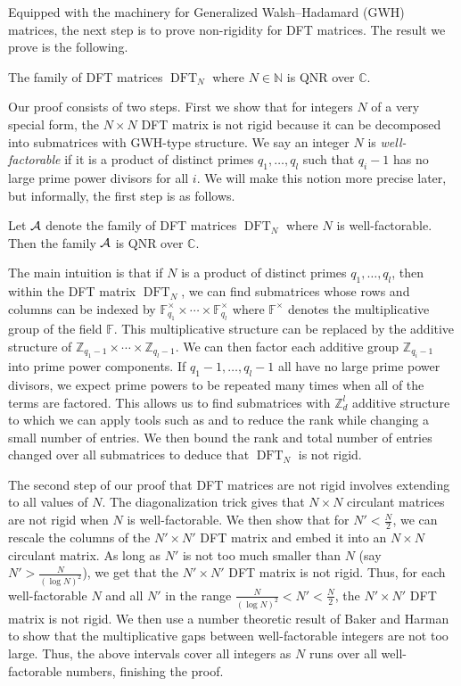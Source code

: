 \documentclass{toc}
\newcommand\F{{\mathbb{F}}}
\renewcommand\Z{{\mathbb{Z}}}
\renewcommand\N{{\mathbb{N}}}
\renewcommand\C{{\mathbb{C}}}
\DeclareMathOperator{\DFT}{DFT}
\begin{document}
Equipped with the machinery for
Generalized Walsh--Hadamard (GWH) matrices,
the next step is to prove non-rigidity for DFT 
matrices.  The result we prove is the following.
\begin{theorem}\label{fullFourier_intro}
The family of DFT matrices $\DFT_N$
where $N \in \N$ is QNR over $\C$.
\end{theorem} 
Our proof consists of two steps.  First we show that for integers $N$ of a very special form, the $N \times N$ DFT 
 matrix is not rigid because it can be decomposed into submatrices with 
GWH-type structure.  We say an integer $N$ is
\emph{well-factorable}  %
%
if it is a product of distinct primes $q_1, \dots , q_l$ such that %
$q_i - 1$ has no large prime power divisors for all $i$.
%
%
We will make this notion more precise later, but informally, the first step is
as follows. 
\begin{theorem} \label{main_informal}
Let $\cal A$ denote the family of DFT matrices $\DFT_N$
 where $N$ is well-factorable.  Then the family $\cal A$ is QNR over $\C$.
\end{theorem}
The main intuition is that if $N$ is a product of distinct primes
$q_1, \dots , q_l$, then within the DFT matrix $\DFT_N$,
we can find submatrices whose rows and columns can be indexed by
$\F_{q_1}^{\times} \times \cdots \times \F_{q_l}^{\times}$ where
$\F^{\times}$ denotes the multiplicative group of the field $\F$.
This multiplicative structure can be replaced by the additive structure of $\Z_{q_1-1} \times \cdots \times \Z_{q_l-1}$.  We can then factor each additive group $\Z_{q_i-1}$ into prime power components.  If $q_1-1, \dots , q_l-1$ all have no large prime power divisors, we expect prime powers to be repeated many times when all of the terms are factored. This allows us to find submatrices with $\Z_d^l$ additive structure
%
to  %
which we can apply tools such as  and  to reduce the rank while changing a small number of entries.  We then bound the rank and total number of entries changed over all submatrices to deduce that $\DFT_N$ is not rigid.

The second step of our proof that DFT
matrices are not rigid involves extending  to all values of $N$. The diagonalization trick gives that $N \times N$ circulant matrices are not rigid when $N$ is well-factorable.  We then show that for $N' < \frac{N}{2}$, we can rescale the columns of the $N' \times N'$ DFT 
 matrix and embed it into an $N \times N$ circulant matrix.  As long as $N'$ is not too much smaller than $N$ (say $N' > \frac{N}{(\log N)^2}$), we get that the $N' \times N'$ DFT 
 matrix is not rigid.  Thus, for each well-factorable $N$ and all $N'$ in the range $\frac{N}{(\log N)^2} < N' < \frac{N}{2}$, the $N' \times N'$ DFT 
matrix is not rigid.  We then use a number theoretic result of
Baker and Harman  %
\cite{smooth_primes} to show that the
%
%
%
multiplicative gaps  %
between well-factorable integers are not too large. Thus, the above intervals cover all integers as $N$ runs over all well-factorable numbers, finishing the proof.   
\end{document}

